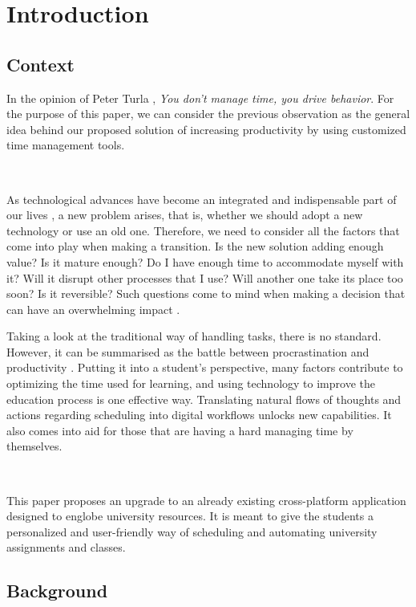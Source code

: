 \chapter{Introduction} \label{chapter1}

\section{Context} \label{1:context}
In the opinion of Peter Turla \cite{turla1983time}, \textit{You don’t manage time, you drive behavior}. For the purpose of this paper, we can consider the previous observation as the general idea behind our proposed solution of increasing productivity by using customized time management tools. 

~

As technological advances have become an integrated and indispensable part of our lives \cite{deb2014information}, a new problem arises, that is, whether we should adopt a new technology or use an old one. Therefore, we need to consider all the factors that come into play when making a transition.  Is the new solution adding enough value? Is it mature enough? Do I have enough time to accommodate myself with it? Will it disrupt other processes that I use? Will another one take its place too soon? Is it reversible? Such questions come to mind when making a decision that can have an overwhelming impact \cite{butler2002barriers}.

Taking a look at the traditional way of handling tasks, there is no standard. However, it can be summarised as the battle between procrastination and productivity \cite{peper2014increase}. Putting it into a student’s perspective, many factors contribute to optimizing the time used for learning, and using technology to improve the education process is one effective way. Translating natural flows of thoughts and actions regarding scheduling into digital workflows unlocks new capabilities. It also comes into aid for those that are having a hard managing time by themselves.

~

This paper proposes an upgrade to an already existing cross-platform application designed to englobe university resources. It is meant to give the students a personalized and user-friendly way of scheduling and automating university assignments and classes.



\section{Background} \label{1:background}

